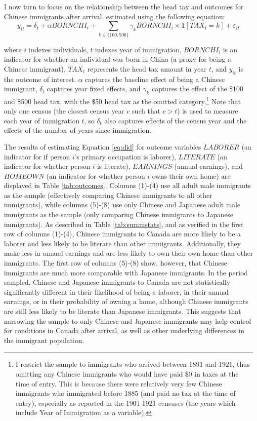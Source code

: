 \documentclass[12pt]{article}
\begin{document}
I now turn to focus on the relationship between the head tax and outcomes for Chinese immigrants after arrival, estimated using the following equation: 
\begin{equation}
    \label{eq:did}
    y_{it} = \delta_t + \alpha BORNCHI_i + \sum_{k \in \{100, 500\}} \gamma_k BORNCHI_i \times \mathbf{1}[TAX_t = k] + \varepsilon_{it}
\end{equation}

where $i$ indexes individuals, $t$ indexes year of immigration, $BORNCHI_i$ is an indicator for whether an individual was born in China (a proxy for being a Chinese immigrant), $TAX_t$ represents the head tax amount in year $t$, and $y_{it}$ is the outcome of interest. $\alpha$ captures the baseline effect of being a Chinese immigrant, $\delta_t$ captures year fixed effects, and $\gamma_k$ captures the effect of the \$100 and \$500 head tax, with the \$50 head tax as the omitted category.\footnote{I restrict the sample to immigrants who arrived between 1891 and 1921, thus omitting any Chinese immigrants who would have paid \$0 in taxes at the time of entry. This is because there were relatively very few Chinese immigrants who immigrated before 1885 (and paid no tax at the time of entry), especially as reported in the 1901-1921 censuses (the years which include Year of Immigration as a variable).} 
Note that only one census (the closest census year $c$ such that $c > t$) is used to measure each year of immigration $t$, so $\delta_t$ also captures effects of the census year and the effects of the number of years since immigration. 

The results of estimating Equation \ref{eq:did} for outcome variables $LABORER$ (an indicator for if person $i$'s primary occupation is laborer), $LITERATE$ (an indicator for whether person $i$ is literate), $EARNINGS$ (annual earnings), and $HOMEOWN$ (an indicator for whether person $i$ owns their own home) are displayed in Table \ref{tab:outcomes}. Columns (1)-(4) use all adult male immigrants as the sample (effectively comparing Chinese immigrants to all other immigrants), while columns (5)-(8) use only Chinese and Japanese adult male immigrants as the sample (only comparing Chinese immigrants to Japanese immigrants). 
As described in Table \ref{tab:summstats}, and as verified in the first row of columns (1)-(4), Chinese immigrants to Canada are more likely to be a laborer and less likely to be literate than other immigrants. Additionally, they make less in annual earnings and are less likely to own their own home than other immigrants. The first row of columns (5)-(8) show, however, that Chinese immigrants are much more comparable with Japanese immigrants. In the period sampled, Chinese and Japanese immigrants to Canada are not statistically significantly different in their likelihood of being a laborer, in their annual earnings, or in their probability of owning a home, although Chinese immigrants are still less likely to be literate than Japanese immigrants. This suggests that narrowing the sample to only Chinese and Japanese immigrants may help control for conditions in Canada after arrival, as well as other underlying differences in the immigrant population.
\end{document}
